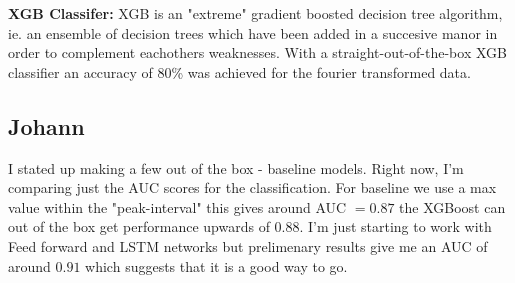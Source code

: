 \documentclass{article}
\begin{document}
\textbf{XGB Classifer:}
XGB is an "extreme" gradient boosted decision tree algorithm, ie. an ensemble of decision trees which have been added in a succesive manor in order to complement eachothers weaknesses.
With a straight-out-of-the-box XGB classifier an accuracy of 80\% was achieved for the fourier transformed data.


\subsection{Johann}
I stated up making a few out of the box - baseline models. Right now, I'm comparing just the AUC scores for the classification. For baseline we use a max value within the "peak-interval" this gives around AUC $= 0.87$ the XGBoost can out of the  box get performance upwards of $0.88$. I'm just starting to work with Feed forward and LSTM networks but prelimenary results give me an AUC of around $0.91$ which suggests that it is a good way to go. 
\end{document}
